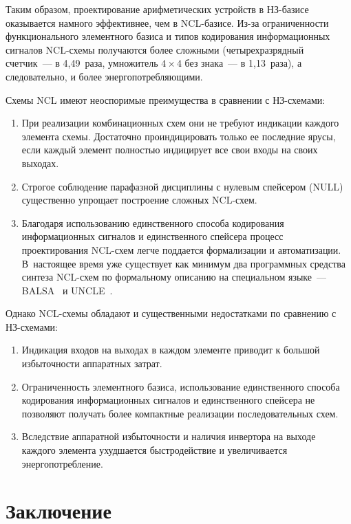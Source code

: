\begin{multicols}{2}
      
Таким образом, проектирование арифметических устройств в НЗ-ба\-зи\-се оказывается 
намного эффективнее, чем в NCL-ба\-зи\-се. Из-за ограниченности функционального 
элементного базиса и типов кодирования информационных сигналов NCL-схе\-мы 
получаются более сложными (четырехразрядный счетчик~--- в 4,49~раза, умножитель 
$4\times 4$ без знака~--- в 1,13~раза), а следовательно, и более энергопотребляющими.
       


       Схемы NCL имеют неоспоримые преимущества в сравнении с НЗ-схемами: 
    \begin{enumerate}[1.]
       \item При реализации комбинационных схем они не требуют индикации каждого 
элемента схемы. Достаточно проиндицировать только ее последние ярусы, если каждый элемент 
полностью индицирует все свои входы на своих выходах.
       \item Строгое соблюдение парафазной дисциплины с нулевым спейсером (NULL) 
существенно упрощает построение сложных NCL-схем. 
       \item Благодаря использованию единственного способа кодирования 
информационных сигналов и единственного спейсера процесс проектирования NCL-схем 
легче поддается формализации и автоматизации. В~настоящее время уже существует как 
минимум два программных средства синтеза NCL-схем по формальному описанию на 
специальном языке~--- BALSA~\cite{76-sok} и \mbox{UNCLE}~\cite{77-sok}.
       \end{enumerate}
       
       Однако NCL-схемы обладают и существенными недостатками по сравнению с 
       НЗ-схе\-мами:
       \begin{enumerate}[1.]
       \item Индикация входов на выходах в каждом элементе приводит к большой 
избыточности аппаратных затрат.
       \item Ограниченность элементного базиса, использование единственного способа 
кодирования информационных сигналов и единственного спейсера не позволяют получать 
более компактные реализации последовательных схем.
       \item Вследствие аппаратной избыточности и наличия инвертора на выходе 
каждого элемента ухудшается быстродействие и увеличивается энергопотребление.
       \end{enumerate}
       
      

\section{Заключение}
       

\end{multicols}
